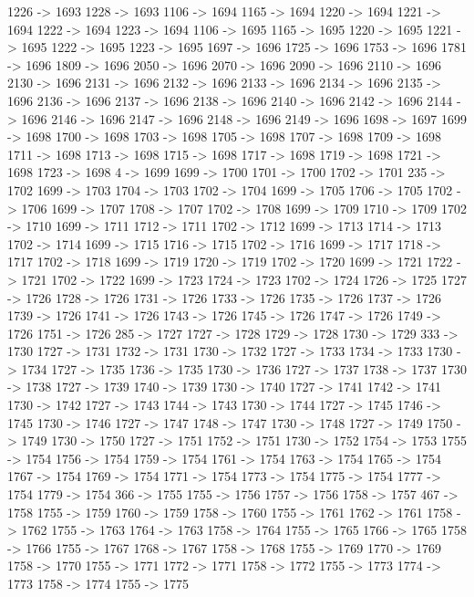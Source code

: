 {	1226 -> 1693
	1228 -> 1693
	1106 -> 1694
	1165 -> 1694
	1220 -> 1694
	1221 -> 1694
	1222 -> 1694
	1223 -> 1694
	1106 -> 1695
	1165 -> 1695
	1220 -> 1695
	1221 -> 1695
	1222 -> 1695
	1223 -> 1695
	1697 -> 1696
	1725 -> 1696
	1753 -> 1696
	1781 -> 1696
	1809 -> 1696
	2050 -> 1696
	2070 -> 1696
	2090 -> 1696
	2110 -> 1696
	2130 -> 1696
	2131 -> 1696
	2132 -> 1696
	2133 -> 1696
	2134 -> 1696
	2135 -> 1696
	2136 -> 1696
	2137 -> 1696
	2138 -> 1696
	2140 -> 1696
	2142 -> 1696
	2144 -> 1696
	2146 -> 1696
	2147 -> 1696
	2148 -> 1696
	2149 -> 1696
	1698 -> 1697
	1699 -> 1698
	1700 -> 1698
	1703 -> 1698
	1705 -> 1698
	1707 -> 1698
	1709 -> 1698
	1711 -> 1698
	1713 -> 1698
	1715 -> 1698
	1717 -> 1698
	1719 -> 1698
	1721 -> 1698
	1723 -> 1698
	4 -> 1699
	1699 -> 1700
	1701 -> 1700
	1702 -> 1701
	235 -> 1702
	1699 -> 1703
	1704 -> 1703
	1702 -> 1704
	1699 -> 1705
	1706 -> 1705
	1702 -> 1706
	1699 -> 1707
	1708 -> 1707
	1702 -> 1708
	1699 -> 1709
	1710 -> 1709
	1702 -> 1710
	1699 -> 1711
	1712 -> 1711
	1702 -> 1712
	1699 -> 1713
	1714 -> 1713
	1702 -> 1714
	1699 -> 1715
	1716 -> 1715
	1702 -> 1716
	1699 -> 1717
	1718 -> 1717
	1702 -> 1718
	1699 -> 1719
	1720 -> 1719
	1702 -> 1720
	1699 -> 1721
	1722 -> 1721
	1702 -> 1722
	1699 -> 1723
	1724 -> 1723
	1702 -> 1724
	1726 -> 1725
	1727 -> 1726
	1728 -> 1726
	1731 -> 1726
	1733 -> 1726
	1735 -> 1726
	1737 -> 1726
	1739 -> 1726
	1741 -> 1726
	1743 -> 1726
	1745 -> 1726
	1747 -> 1726
	1749 -> 1726
	1751 -> 1726
	285 -> 1727
	1727 -> 1728
	1729 -> 1728
	1730 -> 1729
	333 -> 1730
	1727 -> 1731
	1732 -> 1731
	1730 -> 1732
	1727 -> 1733
	1734 -> 1733
	1730 -> 1734
	1727 -> 1735
	1736 -> 1735
	1730 -> 1736
	1727 -> 1737
	1738 -> 1737
	1730 -> 1738
	1727 -> 1739
	1740 -> 1739
	1730 -> 1740
	1727 -> 1741
	1742 -> 1741
	1730 -> 1742
	1727 -> 1743
	1744 -> 1743
	1730 -> 1744
	1727 -> 1745
	1746 -> 1745
	1730 -> 1746
	1727 -> 1747
	1748 -> 1747
	1730 -> 1748
	1727 -> 1749
	1750 -> 1749
	1730 -> 1750
	1727 -> 1751
	1752 -> 1751
	1730 -> 1752
	1754 -> 1753
	1755 -> 1754
	1756 -> 1754
	1759 -> 1754
	1761 -> 1754
	1763 -> 1754
	1765 -> 1754
	1767 -> 1754
	1769 -> 1754
	1771 -> 1754
	1773 -> 1754
	1775 -> 1754
	1777 -> 1754
	1779 -> 1754
	366 -> 1755
	1755 -> 1756
	1757 -> 1756
	1758 -> 1757
	467 -> 1758
	1755 -> 1759
	1760 -> 1759
	1758 -> 1760
	1755 -> 1761
	1762 -> 1761
	1758 -> 1762
	1755 -> 1763
	1764 -> 1763
	1758 -> 1764
	1755 -> 1765
	1766 -> 1765
	1758 -> 1766
	1755 -> 1767
	1768 -> 1767
	1758 -> 1768
	1755 -> 1769
	1770 -> 1769
	1758 -> 1770
	1755 -> 1771
	1772 -> 1771
	1758 -> 1772
	1755 -> 1773
	1774 -> 1773
	1758 -> 1774
	1755 -> 1775
}
